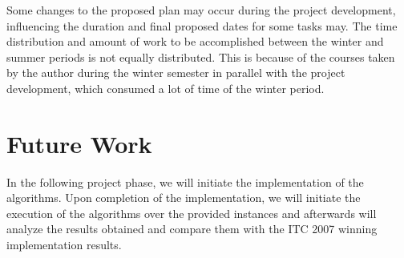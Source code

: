 Some changes to the proposed plan may occur during the project development, influencing the duration and final proposed dates for some tasks may. The time distribution and amount of work to be accomplished between the winter and summer periods is not equally distributed. This is because of the courses taken by the author during the winter semester in parallel with the project development, which consumed a lot of time of the winter period.\\
\section{Future Work}
\label{subsubsec:future-work}
In the following project phase, we will initiate the implementation of the algorithms. Upon completion of the implementation, we will initiate the execution of the algorithms over the provided instances and afterwards will analyze the results obtained and compare them with the ITC 2007 winning implementation results.\\
\let\cleardoublepage\clearpage